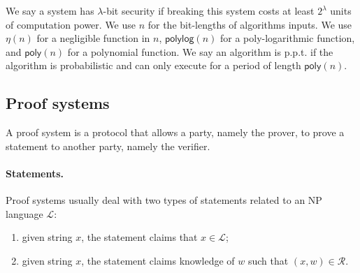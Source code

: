 \documentclass[acmtog]{acmart}
\newcommand{\cL}{\mathcal{L}}
\newcommand{\cR}{\mathcal{R}}
\newcommand{\polylog}{\mathsf{polylog}}
\newcommand{\poly}{\mathsf{poly}}
\begin{document}
We say a system has $\lambda$-bit security if breaking this system costs at least $2^{\lambda}$ units of computation power.
We use $n$ for the bit-lengths of algorithms inputs.
We use $\eta(n)$ for a negligible function in $n$, $\polylog(n)$ for a poly-logarithmic function, and $\poly(n)$ for a polynomial function.
We say an algorithm is p.p.t. if the algorithm is probabilistic and can only execute for a period of length $\poly(n)$.

\subsection{Proof systems}

A proof system is a protocol that allows a party, namely the prover, to prove a statement to another party, namely the verifier.

\paragraph{Statements.} Proof systems usually deal with two types of statements related to an NP language $\cL$:
\begin{enumerate}
	\item given string $x$, the statement claims that $x\in\cL$;
	\item given string $x$, the statement claims knowledge of $w$ such that $(x,w)\in\cR$.
\end{enumerate}
\end{document}
